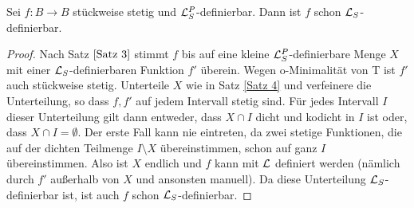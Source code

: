 \begin{lemma}\label{Stückweise stetige Abbildungen}
	Sei $f:B\rightarrow B$ stückweise stetig und $\mathcal{L}^P_S$-definierbar. Dann ist $f$ schon $\mathcal{L}_S$-definierbar.
\end{lemma}
\begin{proof}
	Nach Satz $\ref{Satz 3}$ stimmt $f$ bis auf eine kleine $\mathcal{L}^P_S$-definierbare Menge $X$ mit einer $\mathcal{L}_S$-definierbaren Funktion $f'$ überein. Wegen o-Minimalität von T ist $f'$ auch stückweise stetig. Unterteile $X$ wie in Satz \ref{Satz 4} und verfeinere die Unterteilung, so dass $f,f'$ auf jedem Intervall stetig sind. Für jedes Intervall $I$ dieser Unterteilung gilt dann entweder, dass $X\cap I$ dicht und kodicht in $I$ ist oder, dass $X\cap I=\emptyset$. Der erste Fall kann nie eintreten, da zwei stetige Funktionen, die auf der dichten Teilmenge $I\setminus X$ übereinstimmen, schon auf ganz $I$ übereinstimmen. Also ist $X$ endlich und $f$ kann mit $\mathcal{L}$ definiert werden (nämlich durch $f'$ außerhalb von $X$ und ansonsten manuell). Da diese Unterteilung $\mathcal{L}_S$-definierbar ist, ist auch $f$ schon $\mathcal{L}_S$-definierbar.
\end{proof}

